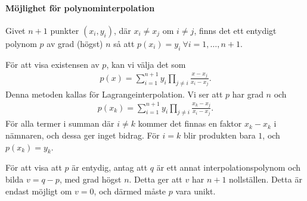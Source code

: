 \paragraph{Möjlighet för polynominterpolation}
Givet $n + 1$ punkter $(x_{i}, y_{i})$, där $x_{i}\neq x_{j}$ om $i\neq j$, finns det ett entydigt polynom $p$ av grad (högst) $n$ så att $p(x_{i}) = y_{i}\ \forall i= 1, \dots, n + 1$.

\proof
För att visa existensen av $p$, kan vi välja det som
\begin{align*}
	p(x) = \sum\limits_{i = 1}^{n + 1}y_{i}\prod\limits_{j\neq i}\frac{x - x_{j}}{x_{i} - x_{j}}.
\end{align*}
Denna metoden kallas för Lagrangeinterpolation. Vi ser att $p$ har grad $n$ och
\begin{align*}
	p(x_{k}) = \sum\limits_{i = 1}^{n + 1}y_{i}\prod\limits_{j\neq i}\frac{x_{k} - x_{j}}{x_{i} - x_{j}}.
\end{align*}
För alla termer i summan där $i\neq k$ kommer det finnas en faktor $x_{k} - x_{k}$ i nämnaren, och dessa ger inget bidrag. För $i = k$ blir produkten bara $1$, och $p(x_{k}) = y_{k}$.

För att visa att $p$ är entydig, antag att $q$ är ett annat interpolationspolynom och bilda $v = q - p$, med grad högst $n$. Detta ger att $v$ har $n + 1$ nollställen. Detta är endast möjligt om $v = 0$, och därmed måste $p$ vara unikt.